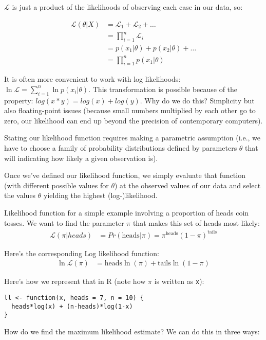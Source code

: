 \documentclass[a4paper,12pt]{article}
\newcommand{\lik}{\mathcal{L}}
\begin{document}
$\lik$ is just a product of the likelihoods of observing each case in our data, so:

\begin{align*}
\lik(\theta|X) & = \lik_1 + \lik_2 + \dots\\
 & = \prod_{i=1}^{n} \lik_i \\
 & = p(x_1|\theta) + p(x_2|\theta) + \dots\\
 & = \prod_{i=1}^{n} p(x_1|\theta)
\end{align*}

It is often more convenient to work with log likelihoods: $\ln\lik = \sum_{i=1}^{n} \ln p(x_i|\theta)$. This transformation is possible because of the property: $log(x*y) = log(x) + log(y)$. Why do we do this? Simplicity but also floating-point issues (because small numbers multiplied by each other go to zero, our likelihood can end up beyond the precision of contemporary computers).

Stating our likelihood function requires making a parametric assumption (i.e., we have to choose a family of probability distributions defined by parameters $\theta$ that will indicating how likely a given observation is).

Once we've defined our likelihood function, we simply evaluate that function (with different possible values for $\theta$) at the observed values of our data and select the values $\theta$ yielding the highest (log-)likelihood.

Likelihood function for a simple example involving a proportion of heads coin tosses. We want to find the parameter $\pi$ that makes this set of heads most likely:
\begin{align*}
\lik(\pi|heads) & = Pr(\text{heads}|\pi) = \pi^\text{heads}(1-\pi)^{\text{tails}}
\end{align*}

Here's the corresponding Log likelihood function:
\begin{align*}
\ln\lik(\pi) & = \text{heads}\ln(\pi) + \text{tails}\ln(1-\pi)
\end{align*}

Here's how we represent that in R (note how $\pi$ is written as \texttt{x}):

\begin{lstlisting}
ll <- function(x, heads = 7, n = 10) {
  heads*log(x) + (n-heads)*log(1-x)
}
\end{lstlisting}

How do we find the maximum likelihood estimate? We can do this in three ways:
\end{document}
